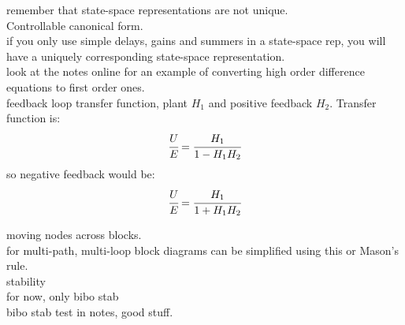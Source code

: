\documentclass{article}
\begin{document}
remember that state-space representations are not unique.\\

Controllable canonical form.\\

if you only use simple delays, gains and summers in a state-space rep, you will have a uniquely corresponding state-space representation.\\

look at the notes online for an example of converting high order difference equations to first order ones.\\

feedback loop transfer function, plant $H_1$ and positive feedback $H_2$. Transfer function is:
\[\cfrac{U}{E}=\cfrac{H_1}{1-H_1H_2}\]
so negative feedback would be:
\[\cfrac{U}{E}=\cfrac{H_1}{1+H_1H_2}\]

moving nodes across blocks.\\
for multi-path, multi-loop block diagrams can be simplified using this or Mason's rule.\\

stability\\

for now, only bibo stab\\

bibo stab test in notes, good stuff.\\
\end{document}

